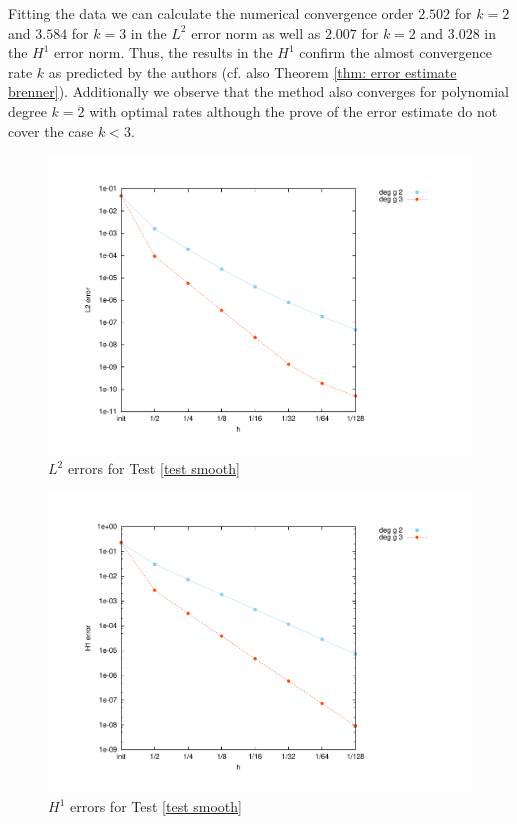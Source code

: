 Fitting the data we can calculate the numerical convergence order $2.502$ for $k=2$ and $3.584$ for $k=3$ in the $L^2$ error norm as well as $2.007$ for $k=2$ and $3.028$ in the $H^1$ error norm. Thus, the results in the $H^1$ confirm the almost convergence rate $k$ as predicted by the authors (cf. also Theorem \ref{thm: error estimate brenner}).
Additionally we observe that the method also converges for polynomial degree $k=2$ with optimal rates although the prove of the error estimate do not cover the case $k<3$.

\begin{figure}[H]
\centering
	\includegraphics[scale=0.45]{plots/MA1_Brenner_l2.pdf}
	\caption{$L^2$ errors for Test \ref{test smooth}}
	\label{fig: Brenner test1}
\end{figure}
\begin{figure}[H]
	\centering
	\includegraphics[scale=0.45]{plots/MA1_Brenner_h1.pdf}
	\caption{$H^1$ errors for Test \ref{test smooth}}
	\label{fig: Brenner test1 h1}
\end{figure}

